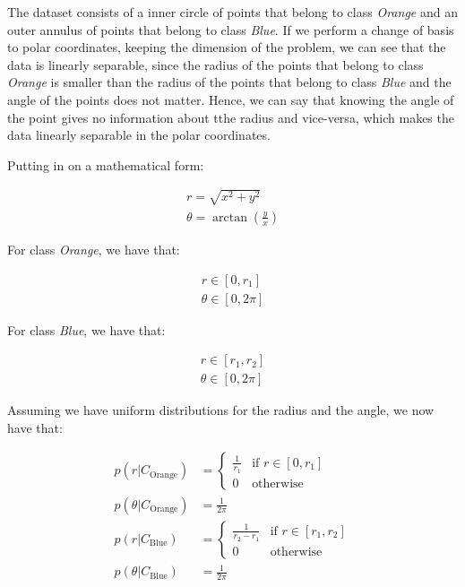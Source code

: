 \documentclass[12pt,a4paper,oneside]{paper}
\begin{document}
The dataset consists of a inner circle of points that belong to class \textit{Orange} and
an outer annulus of points that belong to class \textit{Blue}. If we perform a change of basis to polar coordinates,
keeping the dimension of the problem, we can see that the data is linearly separable, since the radius of the points
that belong to class \textit{Orange} is smaller than the radius of the points that belong to class \textit{Blue} and the
angle of the points does not matter. Hence, we can say that knowing the angle of the point gives no information
about tthe radius and vice-versa, which makes the data linearly separable in the polar coordinates.

Putting in on a mathematical form:

\begin{align*}
    r = \sqrt{x^2 + y^2} \\
    \theta = \arctan\left(\frac{y}{x}\right)
\end{align*}

For class \textit{Orange}, we have that:

\begin{align*}
    r \in [0, r_1] \\
    \theta \in [0, 2\pi]
\end{align*}

For class \textit{Blue}, we have that:

\begin{align*}
    r \in [r_1, r_2] \\
    \theta \in [0, 2\pi]
\end{align*}

Assuming we have uniform distributions for the radius and the angle, we now have that: 

\begin{align*}
    p(r | C_{\text{Orange}}) &= \begin{cases}
        \frac{1}{r_1} & \text{if } r \in [0, r_1] \\
        0 & \text{otherwise}
    \end{cases} \\
    p(\theta | C_{\text{Orange}}) &= \frac{1}{2\pi} \\
    p(r | C_{\text{Blue}}) &= \begin{cases}
        \frac{1}{r_2 - r_1} & \text{if } r \in [r_1, r_2] \\
        0 & \text{otherwise}
    \end{cases} \\
    p(\theta | C_{\text{Blue}}) &= \frac{1}{2\pi}
\end{align*}
\end{document}
